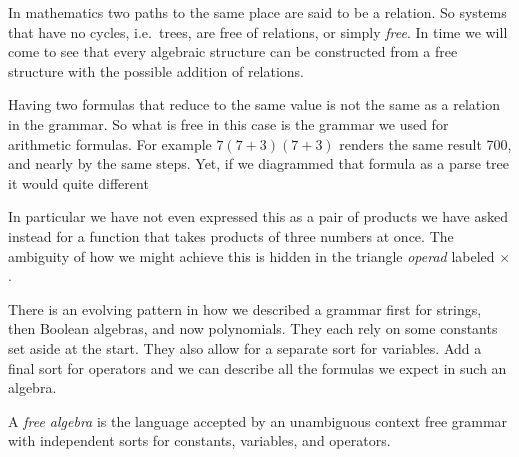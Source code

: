 
In mathematics two paths to the same place are said to be a relation.  So systems that have no cycles, i.e.\ trees, are 
free of relations, or simply \emph{free}.  In time we will come to see 
that every algebraic structure can be constructed from a free 
structure with the possible addition of relations.

\begin{remark}
    Having two formulas that reduce to the same value is not the same 
as a relation in the grammar.  So what is free in this case 
is the grammar we used for arithmetic formulas.  
For example $7(7+3)(7+3)$ renders the same result 700, and nearly 
by the same steps.  Yet, if we diagrammed that formula as a
parse tree it would quite different
\begin{center}
\end{center}    
In particular we have not even expressed this as a pair of products 
we have asked instead for a function that takes products of three 
numbers at once.  The ambiguity of how we might achieve this is hidden in the 
triangle \emph{operad} labeled $\times$.
\end{remark}


There is an evolving pattern in how we described a grammar first for strings, 
then Boolean algebras, and now polynomials.  They each rely on some 
constants set aside at the start.  They also allow for a separate sort for
variables.  Add a final sort for operators and we can describe all the formulas 
we expect in such an algebra.
    
\begin{definition}
    A \emph{free algebra} is the language accepted by an unambiguous context free 
    grammar with independent sorts for constants, variables, and operators.
\end{definition}